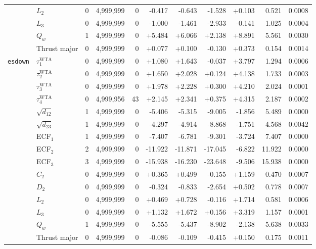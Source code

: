 {\begin{longtable}{llrrrrrrrrr}
 & $L_2$ & 0 & 4{,}999{,}999 & 0 & -0.417 & -0.643 & -1.528 & +0.103 & 0.521 & 0.0008 \\
 & $L_3$ & 0 & 4{,}999{,}999 & 0 & -1.000 & -1.461 & -2.933 & -0.141 & 1.025 & 0.0004 \\
 & $Q_w$ & 1 & 4{,}999{,}999 & 0 & +5.484 & +6.066 & +2.138 & +8.891 & 5.561 & 0.0030 \\
 & Thrust major & 0 & 4{,}999{,}999 & 0 & +0.077 & +0.100 & -0.130 & +0.373 & 0.154 & 0.0014 \\
\midrule
\texttt{esdown} & $\tau_1^{\mathrm{WTA}}$ & 0 & 4{,}999{,}999 & 0 & +1.080 & +1.643 & -0.037 & +3.797 & 1.294 & 0.0006 \\
 & $\tau_2^{\mathrm{WTA}}$ & 0 & 4{,}999{,}999 & 0 & +1.650 & +2.028 & +0.124 & +4.138 & 1.733 & 0.0003 \\
 & $\tau_3^{\mathrm{WTA}}$ & 0 & 4{,}999{,}999 & 0 & +1.978 & +2.228 & +0.300 & +4.210 & 2.024 & 0.0001 \\
 & $\tau_4^{\mathrm{WTA}}$ & 0 & 4{,}999{,}956 & 43 & +2.145 & +2.341 & +0.375 & +4.315 & 2.187 & 0.0002 \\
 & $\sqrt{d_{12}}$ & 1 & 4{,}999{,}999 & 0 & -5.406 & -5.315 & -9.005 & -1.856 & 5.489 & 0.0000 \\
 & $\sqrt{d_{23}}$ & 1 & 4{,}999{,}999 & 0 & -4.297 & -4.914 & -8.868 & -1.751 & 4.568 & 0.0042 \\
 & ECF$_1$ & 1 & 4{,}999{,}999 & 0 & -7.407 & -6.781 & -9.301 & -3.724 & 7.407 & 0.0000 \\
 & ECF$_2$ & 2 & 4{,}999{,}999 & 0 & -11.922 & -11.871 & -17.045 & -6.822 & 11.922 & 0.0000 \\
 & ECF$_3$ & 3 & 4{,}999{,}999 & 0 & -15.938 & -16.230 & -23.648 & -9.506 & 15.938 & 0.0000 \\
 & $C_2$ & 0 & 4{,}999{,}999 & 0 & +0.365 & +0.499 & -0.155 & +1.159 & 0.470 & 0.0007 \\
 & $D_2$ & 0 & 4{,}999{,}999 & 0 & -0.324 & -0.833 & -2.654 & +0.502 & 0.778 & 0.0007 \\
 & $L_2$ & 0 & 4{,}999{,}999 & 0 & +0.469 & +0.728 & -0.116 & +1.714 & 0.581 & 0.0006 \\
 & $L_3$ & 0 & 4{,}999{,}999 & 0 & +1.132 & +1.672 & +0.156 & +3.319 & 1.157 & 0.0001 \\
 & $Q_w$ & 1 & 4{,}999{,}999 & 0 & -5.555 & -5.437 & -8.902 & -2.138 & 5.638 & 0.0033 \\
 & Thrust major & 0 & 4{,}999{,}999 & 0 & -0.086 & -0.109 & -0.415 & +0.150 & 0.175 & 0.0011 \\
\midrule

\end{longtable}}
